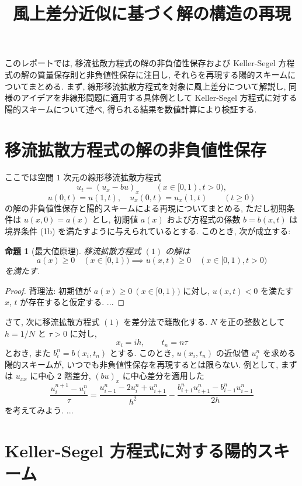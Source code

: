 \documentclass[11pt]{ltjsarticle}
\title{風上差分近似に基づく解の構造の再現}
\date{}
\newtheorem{prop}[theorem]{命題} %
\begin{document}
  \maketitle
  このレポートでは, 移流拡散方程式の解の非負値性保存および Keller-Segel 方程式の解の質量保存則と非負値性保存に注目し, それらを再現する陽的スキームについてまとめる. 
  まず, 線形移流拡散方程式を対象に風上差分について解説し, 同様のアイデアを非線形問題に適用する具体例として Keller-Segel 方程式に対する陽的スキームについて述べ, 得られる結果を数値計算により検証する. 
  \section{移流拡散方程式の解の非負値性保存} 
  ここでは空間 $1$ 次元の線形移流拡散方程式
  \begin{equation}
    u_t = (u_x-bu)_x \qquad (x\in[0, 1), t>0), \tag{1a}
  \end{equation}
  \begin{equation}
      u(0, t) = u(1, t),\quad u_x(0, t) = u_x(1, t) \qquad (t\ge0) \tag{1b}
  \end{equation} 
  の解の非負値性保存と陽的スキームによる再現についてまとめる, ただし初期条件は $u(x, 0) = a(x)$ とし, 初期値 $a(x)$ および方程式の係数 $b=b(x, t)$ は境界条件 (1b) を満たすように与えられているとする. 
  このとき, 次が成立する: 
  \begin{prop}[最大値原理]
    移流拡散方程式 $(1)$ の解は 
    \[
      a(x)\ge 0 \quad (x\in[0, 1)) \implies u(x, t)\ge 0 \quad (x\in[0, 1), t\gt0) 
    \] 
    を満たす. 
  \end{prop}

  \begin{proof}
    背理法: 初期値が $a(x)\ge 0 \ (x\in[0, 1))$ に対し, $u(x, t)< 0$ を満たす $x$, $t$ が存在すると仮定する. ...
  \end{proof}

  さて, 次に移流拡散方程式 $(1)$ を差分法で離散化する. 
  $N$ を正の整数として $h=1/N$ と $\tau>0$ に対し, 
  \[
    x_i = ih,\qquad t_n = n\tau 
  \] とおき, また $b_i^n = b(x_i, t_n)$ とする. このとき, $u(x_i, t_n)$ の近似値 $u_i^n$ を求める陽的スキームが, いつでも非負値性保存を再現するとは限らない. 
  例として, まずは $u_{xx}$ に中心 $2$ 階差分, $(bu)_x$ に中心差分を適用した
  \[
    \dfrac{u^{n+1}_i - u^n_i}{\tau} = \dfrac{u_{i-1}^n - 2u_i^n + u_{i+1}^n}{h^2} - \dfrac{b_{i+1}^nu_{i+1}^n - b_{i-1}^nu_{i-1}^n}{2h}
  \] を考えてみよう. ...
  \section{Keller-Segel 方程式に対する陽的スキーム}
\end{document}
